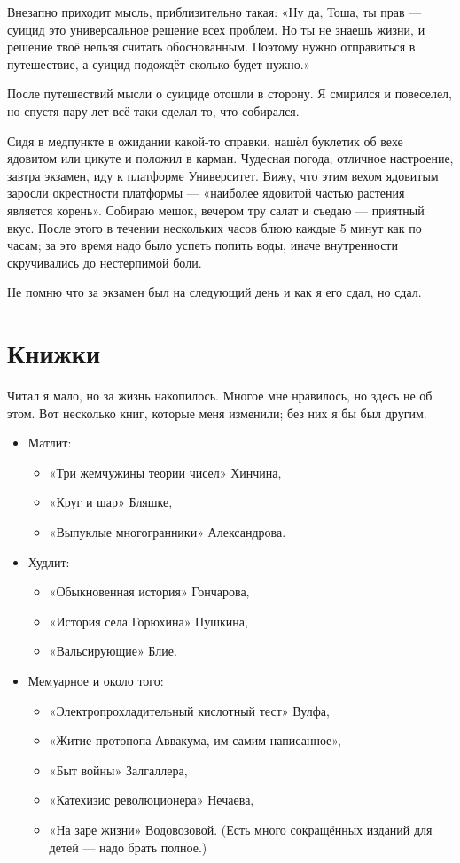 \documentclass{book}
\begin{document}
Внезапно приходит мысль, приблизительно такая:
«Ну да, Тоша, ты прав --- суицид это универсальное решение всех проблем.
Но ты не знаешь жизни, и решение твоё нельзя считать обоснованным.
Поэтому нужно отправиться в путешествие, а суицид подождёт сколько будет нужно.»

После путешествий мысли о суициде отошли в сторону.
Я смирился и повеселел, но спустя пару лет всё-таки сделал то, что собирался.

Сидя в медпункте в ожидании какой-то справки, нашёл буклетик об вехе ядовитом или цикуте и положил в карман.
Чудесная погода, отличное настроение, завтра экзамен, иду к платформе Университет.
Вижу, что этим вехом ядовитым заросли окрестности платформы --- «наиболее ядовитой частью растения является корень».
Собираю мешок, вечером тру салат и съедаю --- приятный вкус.
После этого в течении нескольких часов блюю каждые 5 минут как по часам;
за это время надо было успеть попить воды, иначе внутренности скручивались до нестерпимой боли.

Не помню что за экзамен был на следующий день и как я его сдал, но сдал.

\section*{Книжки}

Читал я мало, но за жизнь накопилось.
Многое мне нравилось, но здесь не об этом.
Вот несколько книг, которые меня изменили; без них я бы был другим.
\begin{itemize}
\item Матлит:
\begin{itemize}
\item «Три жемчужины теории чисел» Хинчина,
\item «Круг и шар» Бляшке,
\item «Выпуклые многогранники» Александрова.
\end{itemize}

\item Худлит:
\begin{itemize}
\item «Обыкновенная история» Гончарова,
\item «История села Горюхина» Пушкина,
\item «Вальсирующие» Блие.
\end{itemize}

\item Мемуарное и около того:
\begin{itemize}
\item «Электропрохладительный кислотный тест» Вулфа,
\item «Житие протопопа Аввакума, им самим написанное»,
\item «Быт войны» Залгаллера,
\item «Катехизис революционера» Нечаева,
\item «На заре жизни» Водовозовой. (Есть много сокращённых изданий для детей --- надо брать полное.)
\end{itemize} 

\end{itemize}
\end{document}
